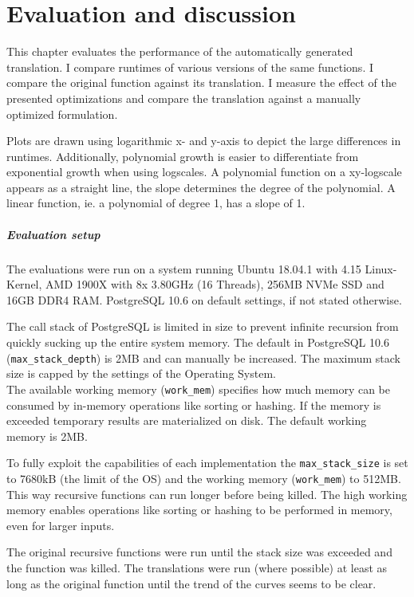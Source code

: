 \chapter{Evaluation and discussion}\label{results_discussion}

This chapter evaluates the performance of the automatically generated translation. I compare runtimes of various versions of the same functions. I compare the original function against its translation. I measure the effect of the presented optimizations and compare the translation against a manually optimized formulation.

Plots are drawn using logarithmic x- and y-axis to depict the large differences in runtimes. Additionally, polynomial growth is easier to differentiate from exponential growth when using logscales. A polynomial function on a xy-logscale appears as a straight line, the slope determines the degree of the polynomial. A linear function, ie. a polynomial of degree 1, has a slope of 1.

\paragraph*{Evaluation setup}
The evaluations were run on a system running Ubuntu 18.04.1 with 4.15 Linux-Kernel, AMD 1900X with 8x 3.80GHz (16 Threads), 256MB NVMe SSD and 16GB DDR4 RAM. PostgreSQL 10.6 on default settings, if not stated otherwise.

The call stack of PostgreSQL is limited in size to prevent infinite recursion from quickly sucking up the entire system memory. The default in PostgreSQL 10.6 (\texttt{max\_stack\_depth}) is 2MB and can manually be increased. The maximum stack size is capped by the settings of the Operating System.\\
The available working memory (\texttt{work\_mem}) specifies how much memory can be consumed by in-memory operations like sorting or hashing. If the memory is exceeded temporary results are materialized on disk. The default working memory is 2MB. \cite[p. 512 ff.]{psql}

To fully exploit the capabilities of each implementation the \texttt{max\_stack\_size} is set to 7680kB (the limit of the OS) and the working memory (\texttt{work\_mem}) to 512MB. This way recursive functions can run longer before being killed. The high working memory enables operations like sorting or hashing to be performed in memory, even for larger inputs.

The original recursive functions were run until the stack size was exceeded and the function was killed. The translations were run (where possible) at least as long as the original function until the trend of the curves seems to be clear.

